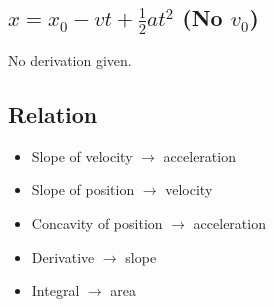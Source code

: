 \documentclass{article}
\begin{document}
\subsection{$ x = x_0 - vt + \frac{1}{2}at^2 $ (No $ v_0 $)}
No derivation given.

\subsection{Relation}
\begin{itemize}
	\item Slope of velocity $ \rightarrow $ acceleration
	\item Slope of position $ \rightarrow $ velocity
	\item Concavity of position $ \rightarrow $ acceleration
	\item Derivative $ \rightarrow $ slope
	\item Integral $ \rightarrow $ area
\end{itemize}
\end{document}
